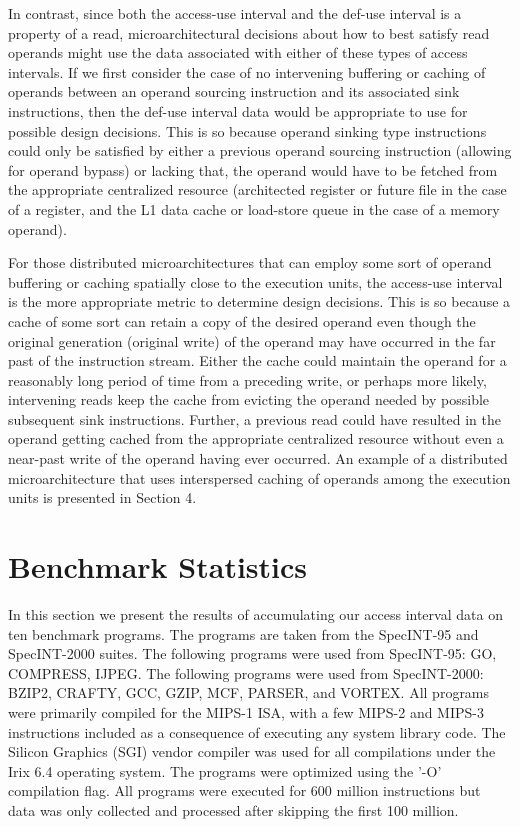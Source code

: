 \documentclass[10pt,dvips]{article}
\begin{document}
In contrast, since both the access-use interval and the def-use
interval is a property of a read, microarchitectural decisions
about how to best satisfy read operands might use the data associated
with either of these types of access intervals.
If we first consider the case of no intervening buffering or caching
of operands between an operand sourcing instruction and its
associated sink instructions, then the def-use interval data would
be appropriate to use for possible design decisions.
This is so because operand sinking type instructions could only
be satisfied by either a previous operand sourcing instruction
(allowing for operand bypass) or lacking that, the operand would have to be
fetched from the appropriate centralized resource (architected
register or future file in the case of a register, and the L1 data
cache or load-store queue in the case of a memory operand).

For those distributed microarchitectures that can employ
some sort of operand buffering or caching spatially close to
the execution units, the access-use interval is the more appropriate
metric to determine design decisions.
This is so because a cache of some sort can retain a copy of the
desired operand even though the original generation (original write)
of the operand may have occurred in the far past of the instruction stream.
Either the cache could maintain the operand for a reasonably long
period of time from a preceding write, or perhaps more likely, 
intervening reads keep
the cache from evicting the operand 
needed by possible subsequent sink instructions.
Further, a previous read could have resulted in the operand getting
cached from the appropriate centralized resource without even a near-past
write of the operand having ever occurred.
An example of a distributed microarchitecture that uses interspersed
caching of operands among the execution units is presented in Section 4.
%
\section{Benchmark Statistics}
%
In this section we present the results of accumulating our
access interval data on ten benchmark programs.
The programs are taken from the SpecINT-95 and SpecINT-2000
suites.
The following programs were used from SpecINT-95: GO, COMPRESS,
IJPEG.  
The following programs were used from SpecINT-2000:
BZIP2, CRAFTY, GCC, GZIP, MCF, PARSER, and VORTEX.
All programs were primarily compiled for the MIPS-1 ISA,
with a few MIPS-2 and MIPS-3 instructions included as a
consequence of executing any system library code.
The Silicon Graphics (SGI) vendor compiler was used for
all compilations under the Irix 6.4 operating system.
The programs were optimized using the '-O' compilation flag.
All programs were executed for 600 million instructions but
data was only collected and processed after skipping the
first 100 million.
\end{document}
